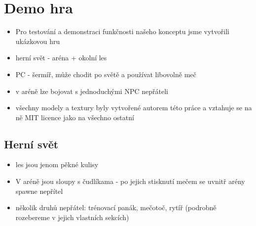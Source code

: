 


\section{Demo hra}
\begin{itemize}
  \item Pro testování a demonstraci funkčnosti našeho konceptu jsme vytvořili ukázkovou hru
  \item herní svět - aréna + okolní les
  \item PC - šermíř, může chodit po světě a používat libovolně meč
  \item v aréně lze bojovat s jednoduchými NPC nepřáteli
  \item všechny modely a textury byly vytvořené autorem této práce a vztahuje se na ně MIT licence jako na všechno ostatní
\end{itemize}

\subsection{Herní svět}
\begin{itemize}
  \item les jsou jenom pěkné kulisy
  \item V aréně jsou sloupy s čudlíkama - po jejich stisknutí mečem se uvnitř arény spawne nepřítel
  \item několik druhů nepřátel: trénovací panák, mečotoč, rytíř (podrobně rozebereme v jejich vlastních sekcích)
\end{itemize}


